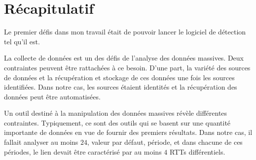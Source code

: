 \section{Récapitulatif}

Le premier défis dans mon travail était de pouvoir lancer le logiciel de détection tel qu'il est. 
%

La collecte de données est un des défis de l'analyse des données massives. Deux contraintes peuvent être rattachées à ce besoin. D'une part, la variété des sources de données et la récupération et stockage de ces données une fois les sources identifiées. Dans notre cas, les sources étaient identités et la récupération des données peut être automatisées.   

Un outil destiné à la manipulation des données massives révèle différentes contraintes.  Typiquement, ce sont des outils qui se basent sur une quantité importante de données en vue de fournir des premiers résultats. Dans notre cas, il fallait analyser au moins $24$, valeur par défaut, période, et dans chacune de ces périodes, le lien devait être caractérisé par au moins  $4$ RTTs différentiels. 








